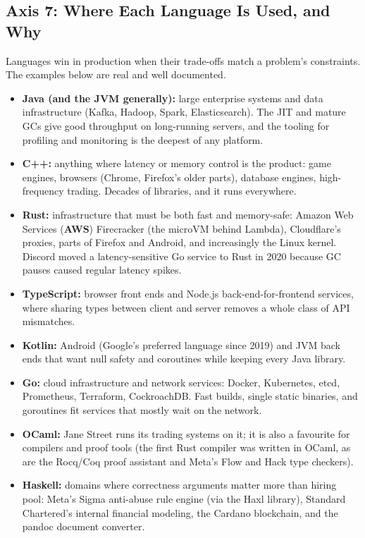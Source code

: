 \subsection{Axis 7: Where Each Language Is Used, and Why}

Languages win in production when their trade-offs match a problem's constraints. The examples below are real and well documented.

\begin{itemize}
  \item \textbf{Java (and the JVM generally):} large enterprise systems and data infrastructure (Kafka, Hadoop, Spark, Elasticsearch). The JIT and mature GCs give good throughput on long-running servers, and the tooling for profiling and monitoring is the deepest of any platform.
  \item \textbf{C++:} anything where latency or memory control is the product: game engines, browsers (Chrome, Firefox's older parts), database engines, high-frequency trading. Decades of libraries, and it runs everywhere.
  \item \textbf{Rust:} infrastructure that must be both fast and memory-safe: Amazon Web Services (\textbf{AWS}) Firecracker (the microVM behind Lambda), Cloudflare's proxies, parts of Firefox and Android, and increasingly the Linux kernel. Discord moved a latency-sensitive Go service to Rust in 2020 because GC pauses caused regular latency spikes.
  \item \textbf{TypeScript:} browser front ends and Node.js back-end-for-frontend services, where sharing types between client and server removes a whole class of API mismatches.
  \item \textbf{Kotlin:} Android (Google's preferred language since 2019) and JVM back ends that want null safety and coroutines while keeping every Java library.
  \item \textbf{Go:} cloud infrastructure and network services: Docker, Kubernetes, etcd, Prometheus, Terraform, CockroachDB. Fast builds, single static binaries, and goroutines fit services that mostly wait on the network.
  \item \textbf{OCaml:} Jane Street runs its trading systems on it; it is also a favourite for compilers and proof tools (the first Rust compiler was written in OCaml, as are the Rocq/Coq proof assistant and Meta's Flow and Hack type checkers).
  \item \textbf{Haskell:} domains where correctness arguments matter more than hiring pool: Meta's Sigma anti-abuse rule engine (via the Haxl library), Standard Chartered's internal financial modeling, the Cardano blockchain, and the pandoc document converter.
\end{itemize}

